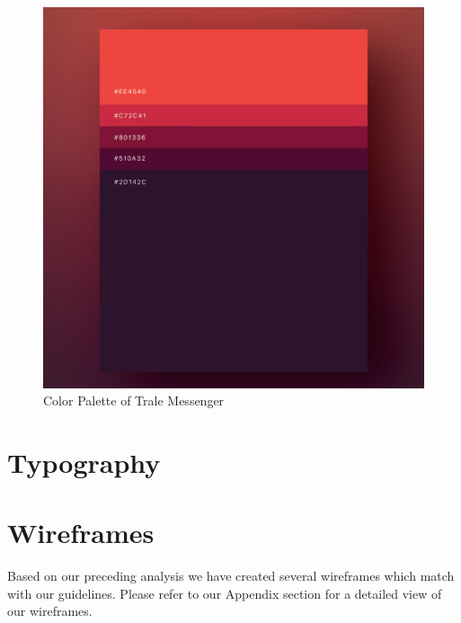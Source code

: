\begin{figure}
    \centering
    \includegraphics[width=1.0\textwidth]{./images/colorPalette.png}
    \caption{Color Palette of Trale Messenger}
    \label{fig:colorPalette}
\end{figure}


\section{Typography}\label{sec:typography}


\section{Wireframes}\label{sec:wireframes}

Based on our preceding analysis we have created several wireframes which match with our guidelines.
Please refer to our Appendix section for a detailed view of our wireframes. %
